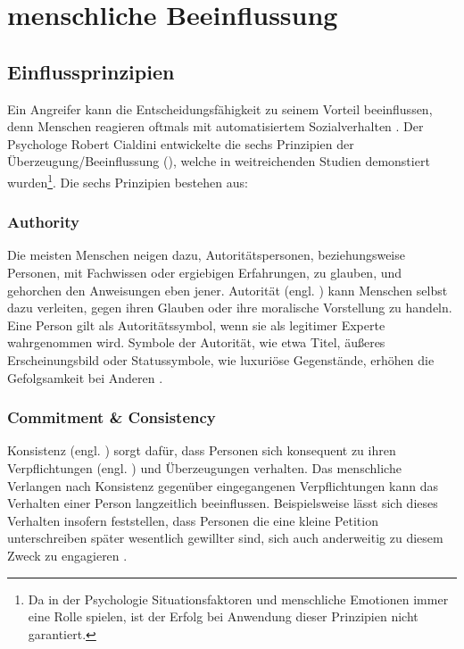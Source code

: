 \section{menschliche Beeinflussung}

\subsection{Einflussprinzipien}

Ein Angreifer kann die Entscheidungsfähigkeit zu seinem Vorteil beeinflussen, denn Menschen reagieren oftmals mit automatisiertem Sozialverhalten .
Der Psychologe Robert Cialdini entwickelte die sechs Prinzipien der Überzeugung/Beeinflussung (),
welche in weitreichenden Studien demonstiert wurden\footnote{Da in der Psychologie Situationsfaktoren und menschliche Emotionen immer eine Rolle spielen, ist der Erfolg bei Anwendung dieser Prinzipien nicht garantiert.}.
Die sechs Prinzipien bestehen aus:

\subsubsection{Authority}
Die meisten Menschen neigen dazu, Autoritätspersonen, beziehungsweise Personen, mit Fachwissen oder ergiebigen Erfahrungen, zu glauben, und gehorchen den Anweisungen eben jener.
Autorität (engl. ) kann Menschen selbst dazu verleiten, gegen ihren Glauben oder ihre moralische Vorstellung zu handeln.
Eine Person gilt als Autoritätssymbol, wenn sie als legitimer Experte wahrgenommen wird. Symbole der Autorität, wie etwa Titel, äu\ss eres Erscheinungsbild oder Statussymbole, wie
luxuriöse Gegenstände, erhöhen die Gefolgsamkeit bei Anderen .

\subsubsection{Commitment \& Consistency}
Konsistenz (engl. ) sorgt dafür, dass Personen sich konsequent zu ihren Verpflichtungen (engl. ) und Überzeugungen verhalten.
Das menschliche Verlangen nach Konsistenz gegenüber eingegangenen Verpflichtungen kann das Verhalten einer Person langzeitlich beeinflussen.
Beispielsweise lässt sich dieses Verhalten insofern feststellen, dass Personen die eine kleine Petition unterschreiben später wesentlich gewillter sind, sich auch anderweitig zu diesem Zweck zu engagieren .

